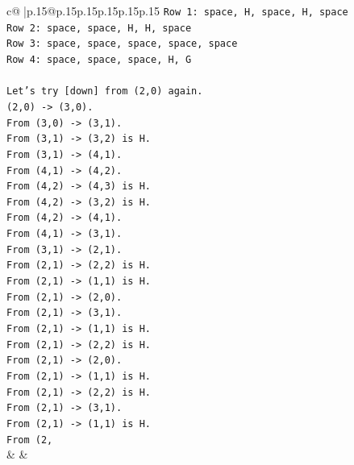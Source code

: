 \documentclass{article}
\begin{document}
{\begin{supertabular}{c@{$\;$}|p{.15\linewidth}@{}p{.15\linewidth}p{.15\linewidth}p{.15\linewidth}p{.15\linewidth}p{.15\linewidth}}
{{{\texttt{Row 1: space, H, space, H, space} \\
\texttt{Row 2: space, space, H, H, space} \\
\texttt{Row 3: space, space, space, space, space} \\
\texttt{Row 4: space, space, space, H, G} \\
\\ 
\texttt{Let's try {[}down{]} from (2,0) again.} \\
\texttt{(2,0) {-}> (3,0).} \\
\texttt{From (3,0) {-}> (3,1).} \\
\texttt{From (3,1) {-}> (3,2) is H.} \\
\texttt{From (3,1) {-}> (4,1).} \\
\texttt{From (4,1) {-}> (4,2).} \\
\texttt{From (4,2) {-}> (4,3) is H.} \\
\texttt{From (4,2) {-}> (3,2) is H.} \\
\texttt{From (4,2) {-}> (4,1).} \\
\texttt{From (4,1) {-}> (3,1).} \\
\texttt{From (3,1) {-}> (2,1).} \\
\texttt{From (2,1) {-}> (2,2) is H.} \\
\texttt{From (2,1) {-}> (1,1) is H.} \\
\texttt{From (2,1) {-}> (2,0).} \\
\texttt{From (2,1) {-}> (3,1).} \\
\texttt{From (2,1) {-}> (1,1) is H.} \\
\texttt{From (2,1) {-}> (2,2) is H.} \\
\texttt{From (2,1) {-}> (2,0).} \\
\texttt{From (2,1) {-}> (1,1) is H.} \\
\texttt{From (2,1) {-}> (2,2) is H.} \\
\texttt{From (2,1) {-}> (3,1).} \\
\texttt{From (2,1) {-}> (1,1) is H.} \\
\texttt{From (2,} \\
            }
        }
    }
    & & \\ \\


\end{supertabular}}
\end{document}
